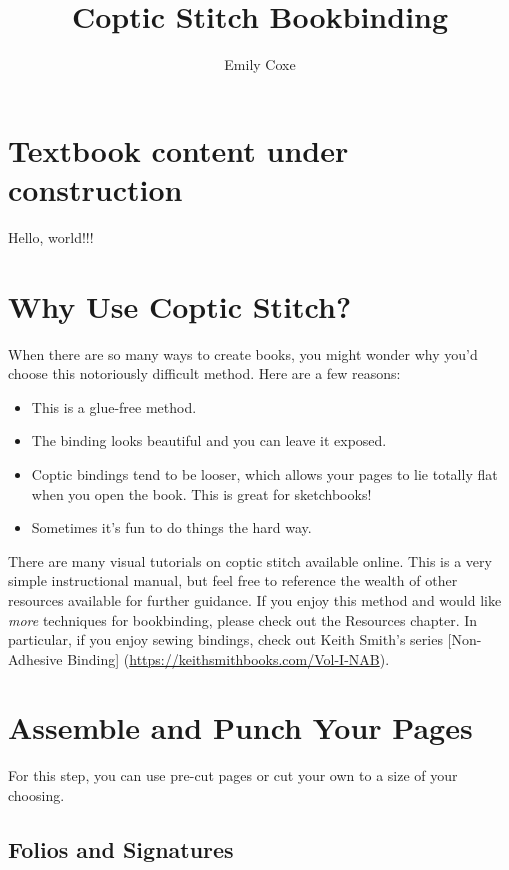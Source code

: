 \documentclass[
  openany]{book}
\title{Coptic Stitch Bookbinding}
\author{Emily Coxe}
\date{}
\providecommand{\tightlist}{%
  \setlength{\itemsep}{0pt}\setlength{\parskip}{0pt}}
\begin{document}
\maketitle

{
\setcounter{tocdepth}{1}
\tableofcontents
}
\chapter{Textbook content under construction}\label{textbook-content-under-construction}

Hello, world!!!

\chapter{Why Use Coptic Stitch?}\label{why-use-coptic-stitch}

When there are so many ways to create books, you might wonder why you'd choose this notoriously difficult method. Here are a few reasons:

\begin{itemize}
\tightlist
\item
  This is a glue-free method.
\item
  The binding looks beautiful and you can leave it exposed.
\item
  Coptic bindings tend to be looser, which allows your pages to lie totally flat when you open the book. This is great for sketchbooks!
\item
  Sometimes it's fun to do things the hard way.
\end{itemize}

There are many visual tutorials on coptic stitch available online.
This is a very simple instructional manual, but feel free to reference the wealth of other resources available for further guidance.
If you enjoy this method and would like \emph{more} techniques for bookbinding, please check out the Resources chapter.
In particular, if you enjoy sewing bindings, check out Keith Smith's series {[}Non-Adhesive Binding{]} (\url{https://keithsmithbooks.com/Vol-I-NAB}).

\chapter{Assemble and Punch Your Pages}\label{assemble-and-punch-your-pages}

For this step, you can use pre-cut pages or cut your own to a size of your choosing.

\section{Folios and Signatures}\label{folios-and-signatures}
\end{document}
